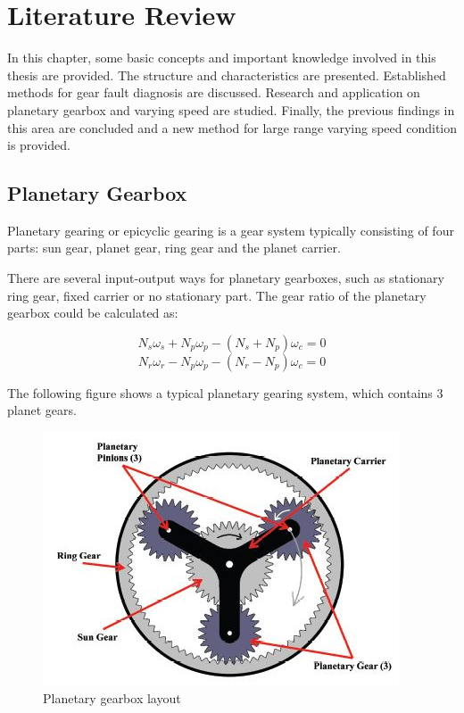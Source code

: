 \chapter{Literature Review}\label{ch:literature}

In this chapter, some basic concepts and important knowledge involved in this thesis are provided. The structure and characteristics are presented. Established methods for gear fault diagnosis are discussed. Research and application on planetary gearbox and varying speed are studied. Finally, the previous findings in this area are concluded and a new method for large range varying speed condition is provided. 

\section{Planetary Gearbox}

Planetary gearing or epicyclic gearing is a gear system typically consisting of four parts: sun gear, planet gear, ring gear and the planet carrier.

There are several input-output ways for planetary gearboxes, such as stationary ring gear, fixed carrier or no stationary part. The gear ratio of the planetary gearbox could be calculated as:

\begin{equation}
	N_s\omega_s + N_p\omega_p - (N_s + N_p)\omega_c = 0
\end{equation}
\begin{equation}
	N_r\omega_r - N_p\omega_p - (N_r - N_p)\omega_c = 0
\end{equation}

The following figure shows a typical planetary gearing system, which contains 3 planet gears.

\begin{figure}
	\centering
	\includegraphics{PGB}
	\caption{Planetary gearbox layout \cite{gearbox}}
	\label{simulationfigure}
\end{figure}

